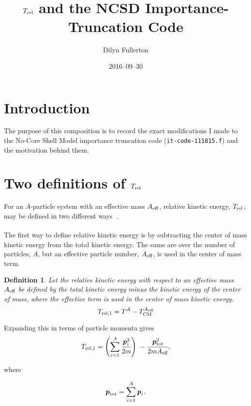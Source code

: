 \documentclass{article}
\def\aeff{A_{\rm{eff}}}
\def\trel{T_{\rm{rel}}}
\def\treli_#1{T_{\rm{rel},#1}}
\def\momvect{\boldsymbol{p}}
\newtheorem{definition}{Definition}[section]
\begin{document}
\title{$T_{\rm{rel}}$ and the NCSD Importance-Truncation Code}
\author{Dilyn Fullerton}
\date{2016--09--30}
\maketitle

\tableofcontents

\section{Introduction}
The purpose of this composition is to record the exact modifications
I made to the No-Core Shell Model importance truncation code
(\texttt{it-code-111815.f}) and the motivation behind them.

\section{Two definitions of $\trel$}
For an $A$-particle system with an effective mass $\aeff$,
relative kinetic energy, $\trel$, may be defined in two different
ways~\cite{treldefs}.
\\\\
The first way to define relative kinetic energy is by subtracting
the center of mass kinetic energy from the total kinetic energy.
The sums are over the number of particles, $A$, but an effective
particle number, $\aeff$, is used in the center of mass term.

\begin{definition}\label{def:trel1}
  Let the relative kinetic energy with respect to an effective mass $\aeff$
  be defined by the total kinetic energy minus the kinetic energy of
  the center of mass, where the effective term is used in the center of
  mass kinetic energy.
  \begin{equation*}
    \treli_1 = T^A - T_{\rm{CM}}^{\aeff}
  \end{equation*}
\end{definition}

Expanding this in terms of particle momenta gives
\begin{equation*}
  \treli_1 =
  \left(\displaystyle\sum_{i=1}^A \cfrac{\momvect_i^2}{2m}\right)
  ~- \cfrac{\momvect_{\rm{tot}}^2}{2m\aeff},
\end{equation*}

where

\begin{equation*}
  \momvect_{\rm{tot}} = \displaystyle\sum_{i=1}^A \momvect_i.
\end{equation*}
\end{document}
